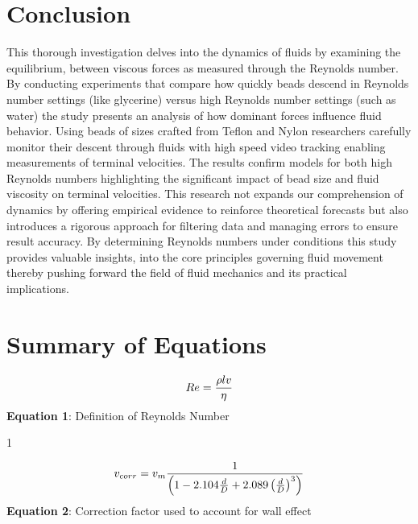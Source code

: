 \documentclass[
	letterpaper
	12pt
]{template}
\begin{document}
\section{Conclusion}
This thorough investigation delves into the dynamics of fluids by examining the equilibrium, between viscous forces as measured through the Reynolds number. By conducting experiments that compare how quickly beads descend in Reynolds number settings (like glycerine) versus high Reynolds number settings (such as water) the study presents an analysis of how dominant forces influence fluid behavior. Using beads of sizes crafted from Teflon and Nylon researchers carefully monitor their descent through fluids with high speed video tracking enabling measurements of terminal velocities. The results confirm models for both high Reynolds numbers highlighting the significant impact of bead size and fluid viscosity on terminal velocities. This research not expands our comprehension of dynamics by offering empirical evidence to reinforce theoretical forecasts but also introduces a rigorous approach for filtering data and managing errors to ensure result accuracy. By determining Reynolds numbers under conditions this study provides valuable insights, into the core principles governing fluid movement thereby pushing forward the field of fluid mechanics and its practical implications.
\newpage
\appendix{}

\section{Summary of Equations}


\begin{minipage}[t]{0.45\textwidth}
	\begin{center}
		\begin{equation}
			\label{reynolds}
			Re = {\rho l v\over \eta}
		\end{equation}
		\textbf{Equation 1}: Definition of Reynolds Number
	\end{center}
\end{minipage}
\hfill1
\begin{minipage}[t]{0.45\textwidth}
	\begin{center}
		\begin{equation}
			\label{wallCorr}
			v_{corr } = v_m {1\over \left(1-2.104{d\over D} + 2.089\left({d\over D}\right)^3\right)}
		\end{equation}
		\textbf{Equation 2}: Correction factor used to account for wall effect \cite{labManual}
	\end{center}
\end{minipage}
\end{document}
